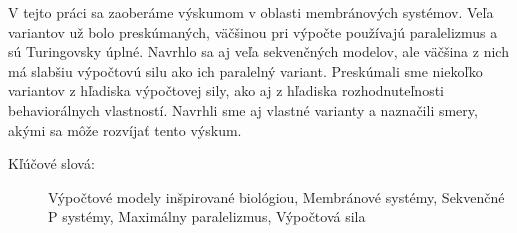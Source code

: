 V tejto práci sa zaoberáme výskumom v oblasti membránových systémov. Veľa variantov už bolo preskúmaných, väčšinou pri výpočte používajú paralelizmus a sú Turingovsky úplné. Navrhlo sa aj veľa sekvenčných modelov, ale väčšina z nich má slabšiu výpočtovú silu ako ich paralelný variant. Preskúmali sme niekoľko variantov z hľadiska výpočtovej sily, ako aj z hľadiska rozhodnuteľnosti behaviorálnych vlastností. Navrhli sme aj vlastné varianty a naznačili smery, akými sa môže rozvíjať tento výskum.

\begin{description}
  \item[Kľúčové slová:] Výpočtové modely inšpirované biológiou, Membránové systémy, Sekvenčné P systémy, Maximálny paralelizmus, Výpočtová sila
\end{description}
